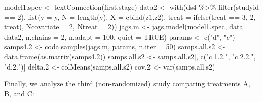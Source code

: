 \documentclass[
  letterpaper,
  DIV=11,
  numbers=noendperiod]{scrreprt}
\newenvironment{Shaded}{\begin{snugshade}}{\end{snugshade}}
\newcommand{\AttributeTok}[1]{\textcolor[rgb]{0.40,0.45,0.13}{#1}}
\newcommand{\ConstantTok}[1]{\textcolor[rgb]{0.56,0.35,0.01}{#1}}
\newcommand{\DecValTok}[1]{\textcolor[rgb]{0.68,0.00,0.00}{#1}}
\newcommand{\FloatTok}[1]{\textcolor[rgb]{0.68,0.00,0.00}{#1}}
\newcommand{\FunctionTok}[1]{\textcolor[rgb]{0.28,0.35,0.67}{#1}}
\newcommand{\NormalTok}[1]{\textcolor[rgb]{0.00,0.23,0.31}{#1}}
\newcommand{\OtherTok}[1]{\textcolor[rgb]{0.00,0.23,0.31}{#1}}
\newcommand{\SpecialCharTok}[1]{\textcolor[rgb]{0.37,0.37,0.37}{#1}}
\newcommand{\StringTok}[1]{\textcolor[rgb]{0.13,0.47,0.30}{#1}}
\begin{document}
\begin{Shaded}
\begin{Highlighting}[]
\NormalTok{model1.spec }\OtherTok{\textless{}{-}} \FunctionTok{textConnection}\NormalTok{(first.stage) }
\NormalTok{data2 }\OtherTok{\textless{}{-}} \FunctionTok{with}\NormalTok{(ds4 }\SpecialCharTok{\%\textgreater{}\%} \FunctionTok{filter}\NormalTok{(studyid }\SpecialCharTok{==} \DecValTok{2}\NormalTok{), }
              \FunctionTok{list}\NormalTok{(}\AttributeTok{y =}\NormalTok{ y,}
                   \AttributeTok{N =} \FunctionTok{length}\NormalTok{(y), }
                   \AttributeTok{X =} \FunctionTok{cbind}\NormalTok{(z1,z2),  }
                   \AttributeTok{treat =} \FunctionTok{ifelse}\NormalTok{(treat }\SpecialCharTok{==} \DecValTok{3}\NormalTok{, }\DecValTok{2}\NormalTok{, treat),}
                   \AttributeTok{Ncovariate =} \DecValTok{2}\NormalTok{, }
                   \AttributeTok{Ntreat =} \DecValTok{2}\NormalTok{))}
\NormalTok{jags.m }\OtherTok{\textless{}{-}} \FunctionTok{jags.model}\NormalTok{(model1.spec, }\AttributeTok{data =}\NormalTok{ data2, }\AttributeTok{n.chains =} \DecValTok{2}\NormalTok{, }\AttributeTok{n.adapt =} \DecValTok{100}\NormalTok{,}
                     \AttributeTok{quiet =}  \ConstantTok{TRUE}\NormalTok{)}
\NormalTok{params }\OtherTok{\textless{}{-}} \FunctionTok{c}\NormalTok{(}\StringTok{"d"}\NormalTok{, }\StringTok{"c"}\NormalTok{) }
\NormalTok{samps4}\FloatTok{.2} \OtherTok{\textless{}{-}} \FunctionTok{coda.samples}\NormalTok{(jags.m, params, }\AttributeTok{n.iter =} \DecValTok{50}\NormalTok{)}
\NormalTok{samps.all.s2 }\OtherTok{\textless{}{-}} \FunctionTok{data.frame}\NormalTok{(}\FunctionTok{as.matrix}\NormalTok{(samps4}\FloatTok{.2}\NormalTok{))}
\NormalTok{samps.all.s2 }\OtherTok{\textless{}{-}}\NormalTok{ samps.all.s2[, }\FunctionTok{c}\NormalTok{(}\StringTok{"c.1.2."}\NormalTok{, }\StringTok{"c.2.2."}\NormalTok{, }\StringTok{"d.2."}\NormalTok{)]}
\NormalTok{delta}\FloatTok{.2} \OtherTok{\textless{}{-}} \FunctionTok{colMeans}\NormalTok{(samps.all.s2)}
\NormalTok{cov}\FloatTok{.2} \OtherTok{\textless{}{-}} \FunctionTok{var}\NormalTok{(samps.all.s2)}
\end{Highlighting}
\end{Shaded}

Finally, we analyze the third (non-randomized) study comparing
treatments A, B, and C:
\end{document}
